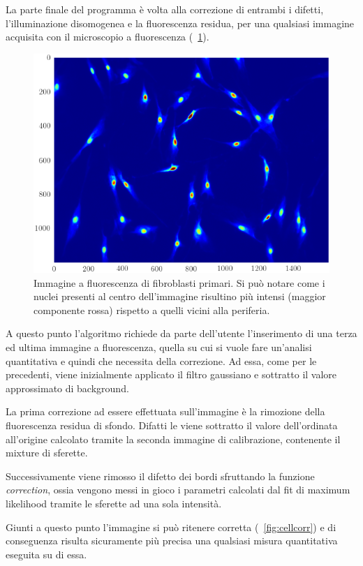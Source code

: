 La parte finale del programma è volta alla correzione di entrambi i difetti, l'illuminazione disomogenea e la fluorescenza residua, per una qualsiasi immagine acquisita con il microscopio a fluorescenza (\figurename~\ref{fig:cell}). 

\begin{figure}[p]
 \centering
 \includegraphics[scale=.64]{img/CAP3cell.png}
 \caption{\small{Immagine a fluorescenza di fibroblasti primari. Si può notare come i nuclei presenti al centro dell'immagine risultino più intensi (maggior componente rossa) rispetto a quelli vicini alla periferia.}}
 \label{fig:cell}
\end{figure}

A questo punto l'algoritmo richiede da parte dell'utente l'inserimento di una terza ed ultima immagine a fluorescenza, quella su cui si vuole fare un'analisi quantitativa e quindi che necessita della correzione.
Ad essa, come per le precedenti, viene inizialmente applicato il filtro gaussiano e sottratto il valore approssimato di background.

La prima correzione ad essere effettuata sull'immagine è la rimozione della fluorescenza residua di sfondo. 
Difatti le viene sottratto il valore dell'ordinata all'origine calcolato tramite la seconda immagine di calibrazione, contenente il mixture di sferette.

Successivamente viene rimosso il difetto dei bordi sfruttando la funzione \textit{correction}, ossia vengono messi in gioco i parametri calcolati dal fit di maximum likelihood tramite le sferette ad una sola intensità.

Giunti a questo punto l'immagine si può ritenere corretta (\figurename~\ref{fig:cellcorr}) e di conseguenza risulta sicuramente più precisa una qualsiasi misura quantitativa eseguita su di essa.

